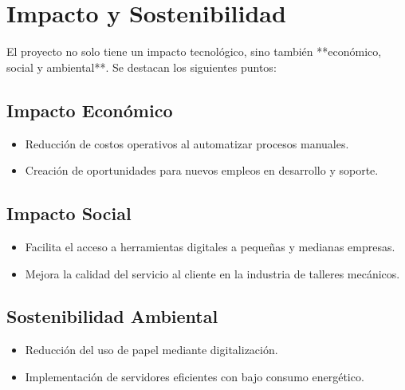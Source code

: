 \section{Impacto y Sostenibilidad}

El proyecto no solo tiene un impacto tecnológico, sino también **económico, social y ambiental**. Se destacan los siguientes puntos:

\subsection{Impacto Económico}
\begin{itemize}
	\item Reducción de costos operativos al automatizar procesos manuales.
	\item Creación de oportunidades para nuevos empleos en desarrollo y soporte.
\end{itemize}

\subsection{Impacto Social}
\begin{itemize}
	\item Facilita el acceso a herramientas digitales a pequeñas y medianas empresas.
	\item Mejora la calidad del servicio al cliente en la industria de talleres mecánicos.
\end{itemize}

\subsection{Sostenibilidad Ambiental}
\begin{itemize}
	\item Reducción del uso de papel mediante digitalización.
	\item Implementación de servidores eficientes con bajo consumo energético.
\end{itemize}
